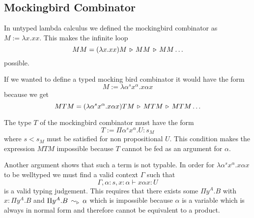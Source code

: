 \subsection{Mockingbird Combinator}

In untyped lambda calculus we defined the mockingbird combinator as $M :=
\lambda x . x x$. This makes the infinite loop
$$
MM = (\lambda x . x x) M \,\triangleright\, M M \,\triangleright\, M M \ldots
$$
%
possible.

If we wanted to define a typed mocking bird combinator it would have the form
$$
M := \lambda \alpha^s x^\alpha. x \alpha x
$$
because we get
$$
M T M
= (\lambda \alpha^s x^\alpha. x \alpha x) T M
\,\triangleright\, M T M
\,\triangleright\, M T M \ldots
$$

The type $T$ of the mockingbird combinator must have the form
$$
T := \Pi \alpha^s x^\alpha. U : s_M
$$
where $s < s_M$ must be satisfied for non propositional $U$. This condition
makes the expression $M T M$ impossible because $T$ cannot be fed as an
argument for $\alpha$.

Another argument shows that such a term is not typable. In order for
$\lambda \alpha^s x^\alpha. x \alpha x$ to be welltyped we must find a valid
context $\Gamma$ such that
$$
\Gamma,\alpha:s,x:\alpha \vdash x \alpha x : U
$$
is a valid typing judgement. This requires that there exists some $\Pi y^A.B$
with $x: \Pi y^A.B$ and $\Pi y^A.B \,\sim_\triangleright\, \alpha$ which is impossible
because $\alpha$ is a variable which is always in normal form and therefore
cannot be equivalent to a product.


